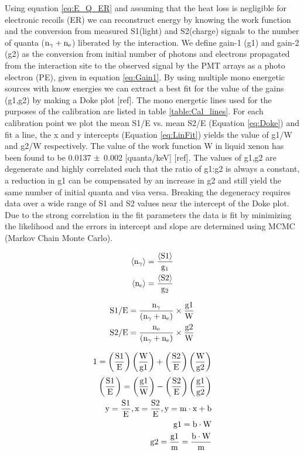 Using equation \ref{eq:E_Q_ER} and assuming that the heat loss is negligible for electronic recoils (ER) we can reconstruct energy by knowing the work function and the conversion from measured S1(light) and S2(charge) signals to the number of quanta ($\rm n_\gamma + n_e$) liberated by the interaction. We define gain-1 (g1) and gain-2 (g2) as the conversion from initial number of photons and electrons propagated from the interaction site to the observed signal by the PMT arrays as a photo electron (PE), given in equation \ref{eq:Gain1}. By using multiple mono energetic sources with know energies we can extract a best fit for the value of the gains (g1,g2) by making a Doke plot [ref]. The mono energetic lines used for the purposes of the calibration are listed in table \ref{table:Cal_lines}. For each calibration point we plot the mean S1/E vs. mean S2/E (Equation \ref{eq:Doke}) and fit a line, the x and y intercepts (Equation \ref{eq:LinFit}) yields the value of g1/W and g2/W respectively. The value of the work function W in liquid xenon has been found to be 0.0137 $\rm \pm$ 0.002 [quanta/keV] [ref]. The values of g1,g2 are degenerate and highly correlated such that the ratio of g1:g2 is always a constant, a reduction in g1 can be compensated by an increase in g2 and still yield the same number of initial quanta and visa versa. Breaking the degeneracy requires data over a wide range of S1 and S2 values near the intercept of the Doke plot. Due to the strong correlation in the fit parameters the data is fit by minimizing the likelihood and the errors in intercept and slope are determined using MCMC (Markov Chain Monte Carlo). 

\begin{equation}
\begin{split}
\rm  \left<n_\gamma\right> = \frac{\left<S1\right>}{g_1}\\
\rm \left<n_{e}\right> = \frac{\left<S2\right>}{g_2}
\label{eq:Gain1}
\end{split}
\end{equation}

\begin{equation}
\begin{split}
\rm  S1/E= \frac{n_\gamma}{(n_\gamma+n_e)}\times\frac{g1}{W} \\
\rm  S2/E= \frac{n_e}{(n_\gamma+n_e)}\times\frac{g2}{W}
\label{eq:Doke}
\end{split}
\end{equation}

\begin{equation}
\begin{split}
\rm  1= \left(\frac{S1}{E}\right)\left(\frac{W}{g1}\right) + \left(\frac{S2}{E}\right)\left(\frac{W}{g2}\right) \\[0.5ex]
\rm  \left(\frac{S1}{E}\right)=\left(\frac{g1}{W}\right) - \left(\frac{S2}{E}\right)\left(\frac{g1}{g2}\right) \\
\rm y=\frac{S1}{E}, x=\frac{S2}{E}, y= m\cdot x + b \\
\rm g1=b\cdot W \\
\rm g2=\frac{g1}{m}=\frac{b\cdot W}{m}
\label{eq:LinFit}
\end{split}
\end{equation}

